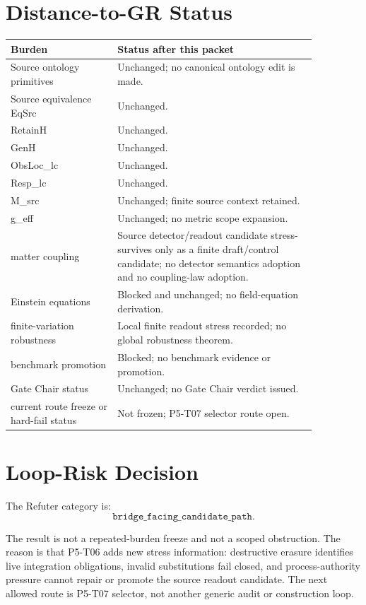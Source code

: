 \documentclass[11pt]{article}
\begin{document}
\section{Distance-to-GR Status}

\begin{longtable}{p{0.30\linewidth}p{0.56\linewidth}}
\toprule
Burden & Status after this packet \\
\midrule
Source ontology primitives & Unchanged; no canonical ontology edit is made. \\
Source equivalence EqSrc & Unchanged. \\
RetainH & Unchanged. \\
GenH & Unchanged. \\
ObsLoc\_lc & Unchanged. \\
Resp\_lc & Unchanged. \\
M\_src & Unchanged; finite source context retained. \\
g\_eff & Unchanged; no metric scope expansion. \\
matter coupling & Source detector/readout candidate stress-survives only as a finite draft/control candidate; no detector semantics adoption and no coupling-law adoption. \\
Einstein equations & Blocked and unchanged; no field-equation derivation. \\
finite-variation robustness & Local finite readout stress recorded; no global robustness theorem. \\
benchmark promotion & Blocked; no benchmark evidence or promotion. \\
Gate Chair status & Unchanged; no Gate Chair verdict issued. \\
current route freeze or hard-fail status & Not frozen; P5-T07 selector route open. \\
\bottomrule
\end{longtable}

\section{Loop-Risk Decision}

The Refuter category is:
\[
  \texttt{bridge\_facing\_candidate\_path}.
\]

The result is not a repeated-burden freeze and not a scoped obstruction. The
reason is that P5-T06 adds new stress information: destructive erasure
identifies live integration obligations, invalid substitutions fail closed,
and process-authority pressure cannot repair or promote the source readout
candidate. The next allowed route is P5-T07 selector, not another generic
audit or construction loop.
\end{document}
